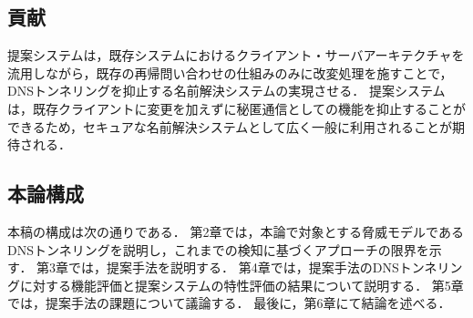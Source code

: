 \subsection{貢献}
提案システムは，既存システムにおけるクライアント・サーバアーキテクチャを流用しながら，既存の再帰問い合わせの仕組みのみに改変処理を施すことで，DNSトンネリングを抑止する名前解決システムの実現させる．
提案システムは，既存クライアントに変更を加えずに秘匿通信としての機能を抑止することができるため，セキュアな名前解決システムとして広く一般に利用されることが期待される．





\subsection{本論構成}
本稿の構成は次の通りである．
第2章では，本論で対象とする脅威モデルであるDNSトンネリングを説明し，これまでの検知に基づくアプローチの限界を示す．
第3章では，提案手法を説明する．
第4章では，提案手法のDNSトンネリングに対する機能評価と提案システムの特性評価の結果について説明する．
第5章では，提案手法の課題について議論する．
最後に，第6章にて結論を述べる．
